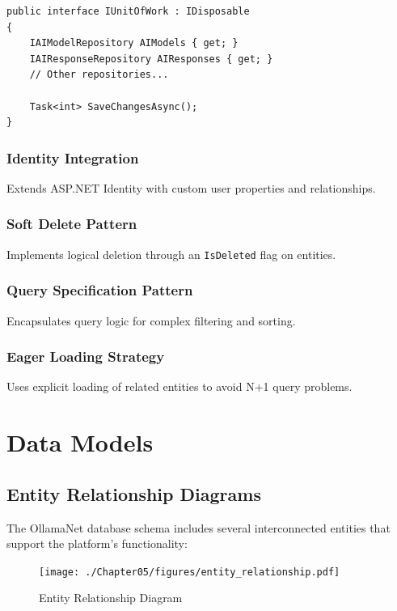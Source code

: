 \begin{verbatim}
public interface IUnitOfWork : IDisposable
{
    IAIModelRepository AIModels { get; }
    IAIResponseRepository AIResponses { get; }
    // Other repositories...
    
    Task<int> SaveChangesAsync();
}
\end{verbatim}

\subsubsection*{Identity Integration}

Extends ASP.NET Identity with custom user properties and relationships.

\subsubsection*{Soft Delete Pattern}

Implements logical deletion through an \texttt{IsDeleted} flag on entities.

\subsubsection*{Query Specification Pattern}

Encapsulates query logic for complex filtering and sorting.

\subsubsection*{Eager Loading Strategy}

Uses explicit loading of related entities to avoid N+1 query problems.

\section{Data Models}

\subsection{Entity Relationship Diagrams}

The OllamaNet database schema includes several interconnected entities that support the platform's functionality:

\begin{figure}
    \centering
    \texttt{[image: ./Chapter05/figures/entity\_relationship.pdf]}
    \caption{Entity Relationship Diagram}
    \label{fig:entity-relationship}
\end{figure}
\clearpage

